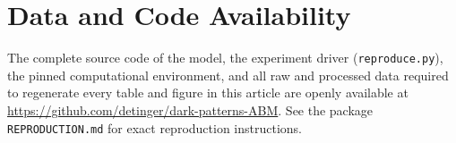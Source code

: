 \documentclass[a4paper]{article}
\begin{document}
\section*{Data and Code Availability}
\label{sec:availability}
The complete source code of the model, the experiment driver (\texttt{reproduce.py}), the pinned computational environment, and all raw and processed data required to regenerate every table and figure in this article are openly available at \url{https://github.com/detinger/dark-patterns-ABM}. See the package \texttt{REPRODUCTION.md} for exact reproduction instructions.
\end{document}
